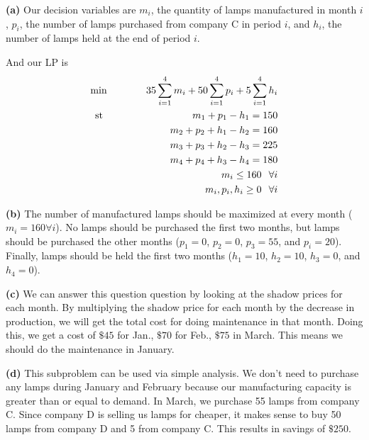 \documentclass[12pt]{article}
\newenvironment{problem}[2][Problem]{\begin{trivlist}
\item[\hskip \labelsep {\bfseries #1}\hskip \labelsep {\bfseries #2.}]}{\end{trivlist}}
\newenvironment{subproblem}[1]{\textbf{(#1)}}{}
\theoremstyle{definition}
\begin{document}
\begin{problem}{5}

\begin{subproblem}{a}
Our decision variables are $m_i$, the quantity of lamps manufactured in month $i$,
$p_i$, the number of lamps purchased from company C in period $i$,
and $h_i$, the number of lamps held at the end of period $i$.

And our LP is
\begin{align*}
\text{min \hspace{0.5in}} 35\sum^4_{i=1}m_i+50\sum^4_{i=1}p_i+5\sum^4_{i=1}h_i \\
\text{st \hspace{1.2in}} m_1+p_1-h_1=150 \\
m_2+p_2+h_1-h_2=160 \\
m_3+p_3+h_2-h_3=225 \\
m_4+p_4+h_3-h_4=180 \\
m_i \leq 160 \hspace{0.1in} \forall i \\
m_i, p_i, h_i \geq 0 \hspace{0.1in} \forall i
\end{align*}
\end{subproblem}

\begin{subproblem}{b}
The number of manufactured lamps should be maximized at every month ($m_i=160 \forall i$).
No lamps should be purchased the first two months, but lamps should be purchased the other months ($p_1=0$, $p_2=0$, $p_3=55$, and $p_i=20$).
Finally, lamps should be held the first two months ($h_1=10$, $h_2=10$, $h_3=0$, and $h_4=0$).
\end{subproblem}

\begin{subproblem}{c}
We can answer this question question by looking at the shadow prices for each month.
By multiplying the shadow price for each month by the decrease in production, we will get the total cost for doing maintenance in that month.
Doing this, we get a cost of $\$45$ for Jan., $\$70$ for Feb., $\$75$ in March.
This means we should do the maintenance in January.
\end{subproblem}

\begin{subproblem}{d}
This subproblem can be used via simple analysis.
We don't need to purchase any lamps during January and February because our manufacturing capacity is greater than or equal to demand.
In March, we purchase 55 lamps from company C.
Since company D is selling us lamps for cheaper, it makes sense to buy 50 lamps from company D and 5 from company C.
This results in savings of $\$250$.
\end{subproblem}


\end{problem}
\end{document}

